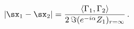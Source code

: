 \begin{equation} \label{eqsep}
|\sx_1-\sx_2| = \frac{\langle \Gamma_1,\Gamma_2 \rangle}{2 \,
\Im(e^{-i \alpha} Z_1)_{r=\infty}}\,.
\end{equation}

